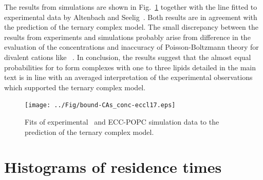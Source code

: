 \documentclass[journal=jpcbfk]{achemso}
\begin{document}
The results from simulations are shown in Fig.~\ref{fig:cacl-bind}
together with the line fitted to experimental data by Altenbach and Seelig~\cite{altenbach84}.
Both results are in agreement with the prediction of the ternary complex model.
The small discrepancy between the results from experiments and simulations probably
arise from difference in the evaluation of the concentrations and
inaccuracy of Poisson-Boltzmann theory for divalent cations like ~\cite{Andelman1995}. 
In conclusion, the results suggest that the almost equal probabilities for
 to form complexes with one to three lipids detailed in the main text is in line with an averaged interpretation of the experimental observations which supported the ternary complex model.
\newpage
\begin{figure}[!h]
  \centering
  \texttt{[image: ../Fig/bound-CAs\_conc-eccl17.eps]}
  \caption{\label{fig:cacl-bind}
    Fits of experimental~\cite{altenbach84} and ECC-POPC simulation data to
    the prediction of the ternary complex model.
    }
\end{figure}

\newpage
\section{Histograms of residence times}
\end{document}
